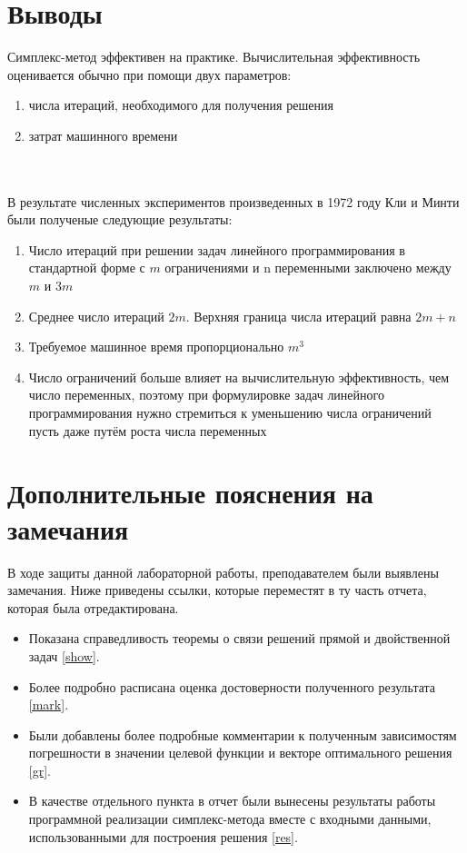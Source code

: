 \documentclass{article}
\begin{document}
\section{Выводы}
\noindent Симплекс-метод эффективен на практике. Вычислительная эффективность оценивается обычно при помощи двух параметров:
\begin{enumerate}
    \item числа итераций, необходимого для получения решения
    \item затрат машинного времени
\end{enumerate}
\\\\
\noindent В результате численных экспериментов произведенных в 1972 году Кли и Минти были полученые следующие результаты:
\begin{enumerate}
    \item Число итераций при решении задач линейного программирования в стандартной форме с $m$ ограничениями и n переменными заключено между $m$ и $3m$
    \item Среднее число итераций $2m$. Верхняя граница числа итераций равна $2m+n$
    \item Требуемое машинное время пропорционально $m^3$
    \item Число ограничений больше влияет на вычислительную эффективность, чем число переменных, поэтому при формулировке задач линейного программирования нужно стремиться к уменьшению числа ограничений пусть даже путём роста числа переменных
\end{enumerate}

\section{Дополнительные пояснения на замечания}
В ходе защиты данной лабораторной работы, преподавателем были выявлены замечания. Ниже приведены ссылки, которые переместят в ту часть отчета, которая была отредактирована.
\begin{itemize}
    \item Показана справедливость теоремы о связи решений прямой и двойственной задач \eqref{show}.
   \item Более подробно расписана оценка достоверности полученного результата \eqref{mark}.
   \item Были добавлены более подробные комментарии к полученным зависимостям погрешности в значении целевой функции и векторе оптимального решения \eqref{gr}.
   \item В качестве отдельного пункта в отчет были вынесены результаты работы программной реализации симплекс-метода вместе с входными данными, использованными для построения решения \eqref{res}.
\end{itemize}
   
\end{document}
